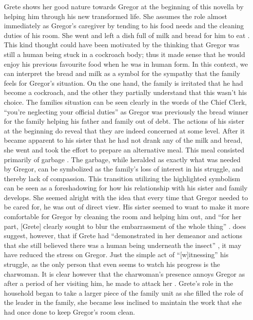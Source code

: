 \documentclass{article}
\begin{document}
Grete shows her good nature towards Gregor at the beginning of this novella
by helping him through his new transformed life. She assumes the role almost
immediately as Gregor's caregiver by tending to his food needs and the
cleaning duties of his room. She went and left a dish full of milk and bread
for him to eat \cite[106]{kafka2007meta}. This kind thought could have been
motivated by the thinking that Gregor was still a human being stuck in a
cockroach body; thus it made sense that he would enjoy his previous
favourite food when he was in human form. In this context, we can interpret
the bread and milk as a symbol for the sympathy that the family feels for
Gregor's situation. On the one hand, the family is irritated that he had
become a cockroach, and the other they partially understand that this wasn't
his choice. The families situation can be seen clearly in the words of the
Chief Clerk, ``you're neglecting your official duties''
\cite[96]{kafka2007meta} as Gregor was previously the bread winner for the
family helping his father and family out of debt. The actions of his sister
at the beginning do reveal that they are indeed concerned at some level.
After it became apparent to his sister that he had not drank any of the milk
and bread, she went and took the effort to prepare an alternative meal. This
meal consisted primarily of garbage \cite[109]{kafka2007meta}. The garbage,
while heralded as exactly what was needed by Gregor, can be symbolized as
the family's loss of interest in his struggle, and thereby lack of
compassion. This transition utilizing the highlighted symbolism can be seen
as a foreshadowing for how his relationship with his sister and family
develops. She seemed alright with the idea that every time that Gregor
needed to be cared for, he was out of direct view. His sister seemed to want
to make it more comfortable for Gregor by cleaning the room and helping him
out, and ``for her part, [Grete] clearly sought to blur the embarrassment of
the whole thing'' \cite[115]{kafka2007meta}. \citeauthor{rowe2002} does
suggest, however, that if Grete had ``demonstrated in her demeanor and actions
that she still believed there was a human being underneath the insect''
\cite[277]{rowe2002}, it may have reduced the stress on Gregor. Just the
simple act of ``[w]itnessing'' his struggle, as the only person that even
seems to watch his progress is the charwoman. It is clear however that the
charwoman's presence annoys Gregor as after a period of her visiting him,
he made to attack her \cite[132]{kafka2007meta}. Grete's role in the
household began to take a larger piece of the family unit as she filled the
role of the leader in the family, she became less inclined to maintain the
work that she had once done to keep Gregor's room clean.
\end{document}
